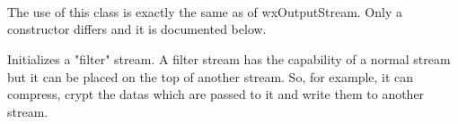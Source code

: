 \section{}\label{wxfilteroutputstream}


\\


The use of this class is exactly the same as of wxOutputStream. Only a constructor
differs and it is documented below.



Initializes a "filter" stream. A filter stream has the capability of a normal
stream but it can be placed on the top of another stream. So, for example, it
can compress, crypt the datas which are passed to it and write them to another
stream.


